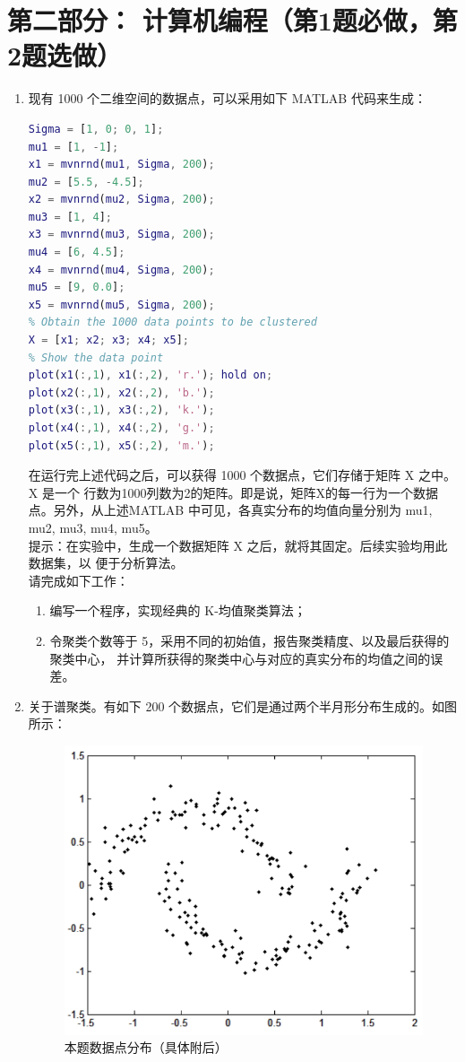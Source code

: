 \documentclass[a4paper,11pt,onecolumn,oneside,UTF8]{article}
\begin{document}
\section*{第二部分： 计算机编程（第1题必做，第2题选做）}
\begin{enumerate}
      \item 现有 1000 个二维空间的数据点，可以采用如下 MATLAB 代码来生成：
            \begin{lstlisting}[language=MATLAB]
Sigma = [1, 0; 0, 1];
mu1 = [1, -1];
x1 = mvnrnd(mu1, Sigma, 200);
mu2 = [5.5, -4.5];
x2 = mvnrnd(mu2, Sigma, 200);
mu3 = [1, 4];
x3 = mvnrnd(mu3, Sigma, 200);
mu4 = [6, 4.5];
x4 = mvnrnd(mu4, Sigma, 200);
mu5 = [9, 0.0];
x5 = mvnrnd(mu5, Sigma, 200);
% Obtain the 1000 data points to be clustered
X = [x1; x2; x3; x4; x5];
% Show the data point
plot(x1(:,1), x1(:,2), 'r.'); hold on;
plot(x2(:,1), x2(:,2), 'b.');
plot(x3(:,1), x3(:,2), 'k.');
plot(x4(:,1), x4(:,2), 'g.');
plot(x5(:,1), x5(:,2), 'm.');
    \end{lstlisting}
            在运行完上述代码之后，可以获得 1000 个数据点，它们存储于矩阵 X 之中。X 是一个
            行数为1000列数为2的矩阵。即是说，矩阵X的每一行为一个数据点。另外，从上述MATLAB
            中可见，各真实分布的均值向量分别为 mu1, mu2, mu3, mu4, mu5。\\
            提示：在实验中，生成一个数据矩阵 X 之后，就将其固定。后续实验均用此数据集，以
            便于分析算法。\\
            请完成如下工作：
            \begin{enumerate}[(1). ]
                  \item 编写一个程序，实现经典的 K-均值聚类算法；
                  \item 令聚类个数等于 5，采用不同的初始值，报告聚类精度、以及最后获得的聚类中心，
                        并计算所获得的聚类中心与对应的真实分布的均值之间的误差。
            \end{enumerate}
      \item
            关于谱聚类。有如下 200 个数据点，它们是通过两个半月形分布生成的。如图所示：\\
            \begin{figure}[H]
                  \centering
                  \includegraphics[width=.8\textwidth]{hw5_1.png}
                  \caption{ 本题数据点分布（具体附后） }
                  \label{img1}
            \end{figure}


\end{enumerate}
\end{document}
